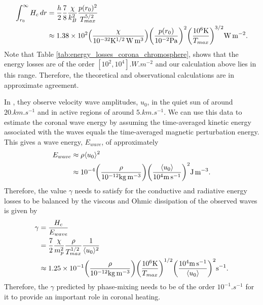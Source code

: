 \begin{equation}
    \begin{aligned}
    \int_{r_0}^\infty H_c \, dr &= \frac{h}{2}\frac{7}{8}\frac{\chi}{k_B^2}\frac{p(r_0)^2}{T_{max}^{5/2}} \\
    &\approx 1.38\times10^{2}\qty(\frac{\chi}{10^{-32}\si{.K^{1/2}.W.m^3}})\qty(\frac{p(r_0)}{10^{-2}\si{.Pa}})^2\qty(\frac{10^6\si{.K}}{T_{max}})^{3/2}\si{.W.m^{-2}}.
    \end{aligned}
\end{equation}
Note that Table \ref{tab:energy_losses_corona_chromosphere}, shows that the energy losses are of the order $[10^2,10^4]\si{.W.m^{-2}}$ and our calculation above lies in this range. Therefore, the theoretical and observational calculations are in approximate agreement. 

In \citet{McIntosh2011,McIntosh2012}, they observe velocity wave amplitudes, $u_0$, in the quiet sun of around $20\si{.km.s^{-1}}$ and in active regions of around $5\si{.km.s^{-1}}$. We can use this data to estimate the coronal wave energy by assuming the time-averaged kinetic energy associated with the waves equals the time-averaged magnetic perturbation energy. This gives a wave energy, $E_{wave}$, of approximately
\begin{equation}
    \label{eq:chap_3_observed_wave_energy}
    \begin{aligned}
    E_{wave} &\approx \rho \langle u_0 \rangle^2 \\
    &\approx10^{-4}\qty(\frac{\rho}{10^{-12}\si{.kg.m^{-3}}}) \qty(\frac{\langle u_0 \rangle}{10^4 \si{.m.s^{-1}}})^2\si{.J.m^{-3}}.
    \end{aligned}
\end{equation}
Therefore, the value $\gamma$ needs to satisfy for the conductive and radiative energy losses to be balanced by the viscous and Ohmic dissipation of the observed waves is given by
\begin{equation}
\label{eq:required_gamma}
\begin{aligned}
    \gamma &= \frac{H_c}{E_{wave}} \\
    &= \frac{7}{2}\frac{\chi}{m_p^2}\frac{\rho}{T_{max}^{1/2}}\frac{1}{\langle u_0\rangle^2} \\
    &\approx1.25\times10^{-1}\qty(\frac{\rho}{10^{-12}\si{.kg.m^{-3}}})\qty(\frac{10^6\si{.K}}{T_{max}})^{1/2}\qty(\frac{10^{4}\si{.m.s^{-1}}}{\langle u_0 \rangle})^2\si{.s^{-1}}.
\end{aligned}
\end{equation}
Therefore, the $\gamma$ predicted by phase-mixing needs to be of the order $10^{-1}\si{.s^{-1}}$ for it to provide an important role in coronal heating.

